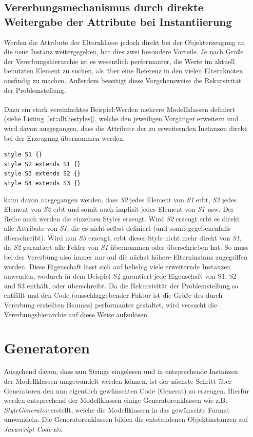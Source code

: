 \subsection{Vererbungsmechanismus durch direkte Weitergabe der Attribute bei Instantiierung}
Werden die Attribute der Elternklasse jedoch direkt bei der Objekterzeugung an die neue Instanz weitergegeben, hat dies zwei besondere Vorteile. Je nach Größe der Vererbungshierarchie ist es wesentlich performanter, die Werte im aktuell benutzten Element zu suchen, als über eine Referenz in den vielen Elternknoten ausfindig zu machen. Außerdem beseitigt diese Vorgehensweise die Rekursivität der Problemstellung.\\\\Dazu ein stark vereinfachtes Beispiel:\linebreak Werden mehrere Modellklassen definiert (siehe Listing \ref{lst:allthestyles}), welche den jeweiligen Vorgänger erweitern und wird davon ausgegangen, dass die Attribute der zu erweiternden Instanzen direkt bei der Erzeugung übernommen werden,
\begin{lstlisting}[style=spray, caption = {Definition einiger Styles, die vom jeweils nächsten Style erweitert werden}, label = {lst:allthestyles}]
style S1 {}
style S2 extends S1 {}
style S3 extends S2 {}
style S4 extends S3 {}
\end{lstlisting}kann davon ausgegangen werden, dass \textit{S2} jedes Element von \textit{S1} erbt, \textit{S3} jedes Element von \textit{S2} erbt und somit auch implizit jedes Element von \textit{S1} usw. Der Reihe nach werden die einzelnen Styles erzeugt. Wird \textit{S2} erzeugt erbt es direkt alle Attribute von \textit{S1}, die es nicht selbst definiert (und somit gegebenenfalls überschreibt). Wird nun \textit{S3} erzeugt, erbt dieser Style nicht mehr direkt von \textit{S1}, da \textit{S2} garantiert alle Felder von \textit{S1} übernommen oder überschrieben hat. So muss bei der Vererbung also immer nur auf die nächst höhere Elterninstanz zugegriffen werden. Diese Eigenschaft lässt sich auf beliebig viele erweiternde Instanzen anwenden, wodurch in dem Beispiel \textit{S4} garantiert jede Eigenschaft von S1, S2 und S3 enthält, oder überschreibt. Da die Rekursivität der Problemstellung so entfällt und den Code (ausschlaggebender Faktor ist die Größe des durch Vererbung erstellten Baumes) performanter gestaltet, wird versucht die Vererbungshierarchie auf diese Weise aufzulösen.

\section{Generatoren}Ausgehend davon, dass nun Strings eingelesen und in entsprechende Instanzen der Modellklassen umgewandelt werden können, ist der nächste Schritt über Generatoren den nun eigentlich gewünschten Code (Generat) zu erzeugen. Hierfür werden entsprechend der Modellklassen einige Generatorenklassen wie z.B. \textit{StyleGenerator} erstellt, welche die Modellklassen in das gewünschte Format umwandeln. Die Generatorenklassen bilden die entstandenen Objektinstanzen auf \textit{Javascript Code} ab.